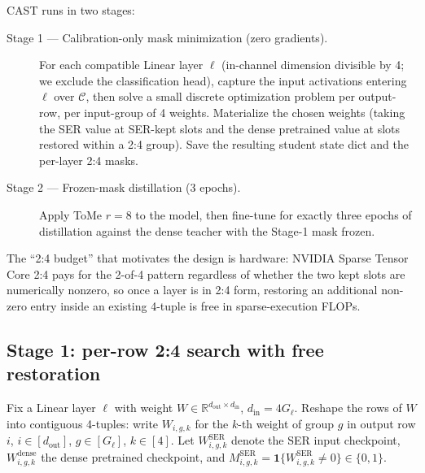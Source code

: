 \documentclass[11pt]{article}
\theoremstyle{plain}
\theoremstyle{definition}
\theoremstyle{remark}
\newcommand{\1}{\mathbf{1}}
\begin{document}
CAST runs in two stages:
\begin{description}
\item[Stage 1 --- Calibration-only mask minimization (zero gradients).] For each compatible Linear layer \(\ell\) (in-channel dimension divisible by 4; we exclude the classification head), capture the input activations entering \(\ell\) over \(\mathcal C\), then solve a small discrete optimization problem per output-row, per input-group of 4 weights.  Materialize the chosen weights (taking the SER value at SER-kept slots and the dense pretrained value at slots restored within a 2:4 group).  Save the resulting student state dict and the per-layer 2:4 masks.
\item[Stage 2 --- Frozen-mask distillation (3 epochs).] Apply ToMe \(r=8\) \cite{bolya2023tome} to the model, then fine-tune for exactly three epochs of distillation against the dense teacher with the Stage-1 mask frozen.
\end{description}

The ``2:4 budget'' that motivates the design is hardware: NVIDIA Sparse Tensor Core 2:4 \cite{mishra2021accelerating} pays for the 2-of-4 pattern regardless of whether the two kept slots are numerically nonzero, so once a layer is in 2:4 form, restoring an additional non-zero entry inside an existing 4-tuple is free in sparse-execution FLOPs.

\subsection{Stage 1: per-row 2:4 search with free restoration}
\label{subsec:cast_stage1}

Fix a Linear layer \(\ell\) with weight \(W\in\mathbb R^{d_{\mathrm{out}}\times d_{\mathrm{in}}}\), \(d_{\mathrm{in}}=4G_\ell\).  Reshape the rows of \(W\) into contiguous 4-tuples: write \(W_{i,g,k}\) for the \(k\)-th weight of group \(g\) in output row \(i\), \(i\in[d_{\mathrm{out}}]\), \(g\in[G_\ell]\), \(k\in[4]\).  Let \(W^{\mathrm{SER}}_{i,g,k}\) denote the SER input checkpoint, \(W^{\mathrm{dense}}_{i,g,k}\) the dense pretrained checkpoint, and \(M^{\mathrm{SER}}_{i,g,k}=\mathbf 1\{W^{\mathrm{SER}}_{i,g,k}\ne 0\}\in\{0,1\}\).
\end{document}
